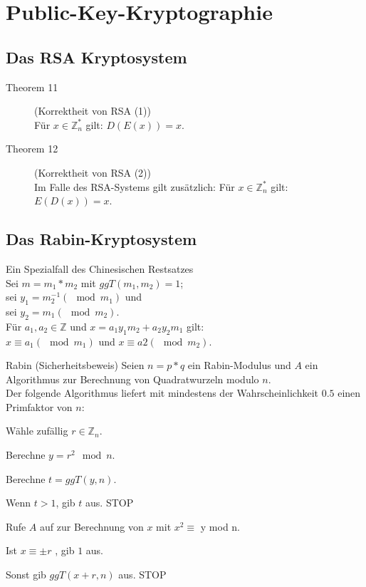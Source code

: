 \documentclass[10pt,a4paper]{article}
\begin{document}
\section{Public-Key-Kryptographie}
\subsection{Das RSA Kryptosystem}
\begin{description}
	\item[Theorem 11] (Korrektheit von RSA (1))\\
Für $x \in \mathds{Z}_n^*$ gilt: $D(E(x)) = x$.
	\item[Theorem 12] (Korrektheit von RSA (2))\\
Im Falle des RSA-Systems gilt zusätzlich:
Für $x \in \mathds{Z}_n^*$ gilt: $E(D(x)) = x$.
\end{description}
\subsection{Das Rabin-Kryptosystem}
\begin{description}
	\item[Theorem 13] Ein Spezialfall des Chinesischen Restsatzes\\
Sei $m = m_1 * m_2$ mit $ggT(m_1 , m_2 ) = 1$;\\
sei $y_1 = m_2^{-1} (\mod m_1 )$ und\\
sei $y_2 = m_1 (\mod m_2 )$.\\
Für $a_1 , a_2 \in \mathds{Z}$ und $x = a_1 y_1 m_2 + a_2 y_2 m_1$ gilt:\\
$x \equiv a_1 (\mod m_1 )$ und $x \equiv a2 (\mod m_2 )$.
	\item[Theorem 14] Rabin (Sicherheitsbeweis)
Seien $n = p * q$ ein Rabin-Modulus und $A$ ein Algorithmus zur Berechnung von Quadratwurzeln modulo $n$.\\
Der folgende Algorithmus liefert mit mindestens der Wahrscheinlichkeit $0.5$ einen Primfaktor von $n$:
\begin{compactitem}
	\item Wähle zufällig $r \in \mathds{Z}_n$.
	\item Berechne $y = r^2 \mod n$.
	\item Berechne $t = ggT(y , n)$.
\begin{compactitem}
	\item Wenn $t > 1$, gib $t$ aus. STOP
\end{compactitem}
	\item Rufe $A$ auf zur Berechnung von $x$ mit $x^2 \equiv$ y mod n.
\begin{compactitem}
	\item Ist $x \equiv \pm r$ , gib $1$ aus.
	\item Sonst gib $ggT(x + r , n)$ aus. STOP
\end{compactitem}
\end{compactitem}
\end{description}
\end{document}
